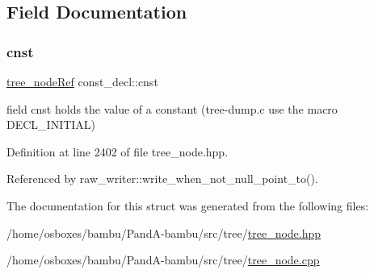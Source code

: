 \subsection{Field Documentation}
\mbox{\label{structconst__decl_a44ff35a4eacdb5788d4effc80cd00bcb}} 
\subsubsection{\texorpdfstring{cnst}{cnst}}
{\footnotesize\ttfamily \hyperlink{tree__node_8hpp_a6ee377554d1c4871ad66a337eaa67fd5}{tree\+\_\+node\+Ref} const\+\_\+decl\+::cnst}



field cnst holds the value of a constant (tree-\/dump.\+c use the macro D\+E\+C\+L\+\_\+\+I\+N\+I\+T\+I\+AL) 



Definition at line 2402 of file tree\+\_\+node.\+hpp.



Referenced by raw\+\_\+writer\+::write\+\_\+when\+\_\+not\+\_\+null\+\_\+point\+\_\+to().



The documentation for this struct was generated from the following files\+:\begin{DoxyCompactItemize}
\item 
/home/osboxes/bambu/\+Pand\+A-\/bambu/src/tree/\hyperlink{tree__node_8hpp}{tree\+\_\+node.\+hpp}\item 
/home/osboxes/bambu/\+Pand\+A-\/bambu/src/tree/\hyperlink{tree__node_8cpp}{tree\+\_\+node.\+cpp}\end{DoxyCompactItemize}
